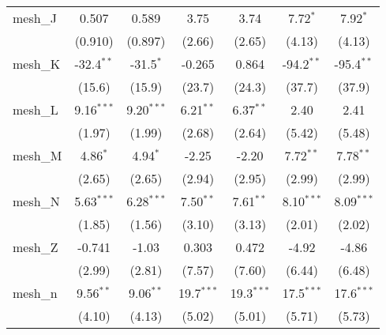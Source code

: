 \begin{tabular}{lcccccc}
   mesh\_J                                                     & 0.507         & 0.589         & 3.75         & 3.74          & 7.72$^{*}$     & 7.92$^{*}$\\   
                                                               & (0.910)       & (0.897)       & (2.66)       & (2.65)        & (4.13)         & (4.13)\\   
   mesh\_K                                                     & -32.4$^{**}$  & -31.5$^{*}$   & -0.265       & 0.864         & -94.2$^{**}$   & -95.4$^{**}$\\   
                                                               & (15.6)        & (15.9)        & (23.7)       & (24.3)        & (37.7)         & (37.9)\\   
   mesh\_L                                                     & 9.16$^{***}$  & 9.20$^{***}$  & 6.21$^{**}$  & 6.37$^{**}$   & 2.40           & 2.41\\   
                                                               & (1.97)        & (1.99)        & (2.68)       & (2.64)        & (5.42)         & (5.48)\\   
   mesh\_M                                                     & 4.86$^{*}$    & 4.94$^{*}$    & -2.25        & -2.20         & 7.72$^{**}$    & 7.78$^{**}$\\   
                                                               & (2.65)        & (2.65)        & (2.94)       & (2.95)        & (2.99)         & (2.99)\\   
   mesh\_N                                                     & 5.63$^{***}$  & 6.28$^{***}$  & 7.50$^{**}$  & 7.61$^{**}$   & 8.10$^{***}$   & 8.09$^{***}$\\   
                                                               & (1.85)        & (1.56)        & (3.10)       & (3.13)        & (2.01)         & (2.02)\\   
   mesh\_Z                                                     & -0.741        & -1.03         & 0.303        & 0.472         & -4.92          & -4.86\\   
                                                               & (2.99)        & (2.81)        & (7.57)       & (7.60)        & (6.44)         & (6.48)\\   
   mesh\_n                                                     & 9.56$^{**}$   & 9.06$^{**}$   & 19.7$^{***}$ & 19.3$^{***}$  & 17.5$^{***}$   & 17.6$^{***}$\\   
                                                               & (4.10)        & (4.13)        & (5.02)       & (5.01)        & (5.71)         & (5.73)\\   

\end{tabular}
